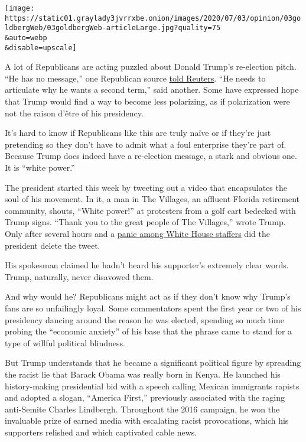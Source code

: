 \texttt{[image: https://static01.graylady3jvrrxbe.onion/images/2020/07/03/opinion/03goldbergWeb/03goldbergWeb-articleLarge.jpg?quality=75\\\&auto=webp\\\&disable=upscale]}

A lot of Republicans are acting puzzled about Donald Trump's re-election
pitch. ``He has no message,'' one Republican source
\href{https://www.reuters.com/article/us-usa-election-trump/fearing-an-election-loss-trump-allies-push-him-to-be-less-polarizing-idUSKBN2427GT}{told
Reuters}. ``He needs to articulate why he wants a second term,'' said
another. Some have expressed hope that Trump would find a way to become
less polarizing, as if polarization were not the raison d'être of his
presidency.

It's hard to know if Republicans like this are truly naïve or if they're
just pretending so they don't have to admit what a foul enterprise
they're part of. Because Trump does indeed have a re-election message, a
stark and obvious one. It is ``white power.''

The president started this week by tweeting out a video that
encapsulates the soul of his movement. In it, a man in The Villages, an
affluent Florida retirement community, shouts, ``White power!'' at
protesters from a golf cart bedecked with Trump signs. ``Thank you to
the great people of The Villages,'' wrote Trump. Only after several
hours and a
\href{https://www.washingtonpost.com/politics/trump-white-power-tweet-set-off-a-scramble-inside-the-white-house--but-no-clear-condemnation/2020/06/29/6fd88c2c-ba21-11ea-8cf5-9c1b8d7f84c6_story.html}{panic
among White House staffers} did the president delete the tweet.

His spokesman claimed he hadn't heard his supporter's extremely clear
words. Trump, naturally, never disavowed them.

And why would he? Republicans might act as if they don't know why
Trump's fans are so unfailingly loyal. Some commentators spent the first
year or two of his presidency dancing around the reason he was elected,
spending so much time probing the ``economic anxiety'' of his base that
the phrase came to stand for a type of willful political blindness.

But Trump understands that he became a significant political figure by
spreading the racist lie that Barack Obama was really born in Kenya. He
launched his history-making presidential bid with a speech calling
Mexican immigrants rapists and adopted a slogan, ``America First,''
previously associated with the raging anti-Semite Charles Lindbergh.
Throughout the 2016 campaign, he won the invaluable prize of earned
media with escalating racist provocations, which his supporters relished
and which captivated cable news.

